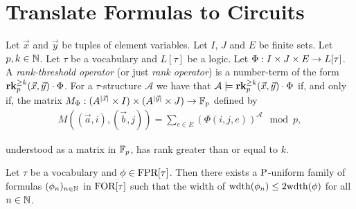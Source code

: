 \documentclass[../main/thesis.tex]{subfiles}
\begin{document}
\section{Translate Formulas to Circuits}

\begin{definition}
  Let $\vec{x}$ and $\vec{y}$ be tuples of element variables. Let $I$, $J$ and
  $E$ be finite sets. Let $p , k \in \mathbb{N}$. Let $\tau$ be a vocabulary and
  $L[\tau]$ be a logic. Let $\Phi : I \times J \times E \rightarrow L[\tau]$. A
  \emph{rank-threshold operator} (or just \emph{rank operator}) is a number-term
  of the form $\text{\textbf{rk}}^{\geq k}_p (\vec{x}, \vec{y}) \cdot \Phi$. For a
  $\tau$-structure $\mathcal{A}$ we have that $\mathcal{A} \models \text{\textbf{rk}}^{\geq
    k}_p (\vec{x}, \vec{y}) \cdot \Phi$ if, and only if, the matrix $M_\Phi :
  (A^{\vert \vec{x} \vert} \times I) \times (A^{\vert \vec{y} \vert} \times J)
  \rightarrow \mathbb{F}_p$ defined by
  \begin{align*}
    M((\vec{a}, i), (\vec{b}, j)) = \sum_{e
    \in E} (\Phi(i,j,e))^{\mathcal{A}} \mod p,
  \end{align*}

  understood as a matrix in $\mathbb{F}_p$, has rank greater than or equal to $k$.
\end{definition}

\begin{lem}
  Let $\tau$ be a vocabulary and $\phi \in \text{\upshape FPR}[\tau]$. Then there exists a
  $\mathrm{P}$-uniform family of formulas $(\phi_n)_{n \in \mathbb{N}}$ in $\text{\upshape FOR}[\tau]$ such
  that the width of $\mathrm{wdth}(\phi_n) \leq 2 \mathrm{wdth} (\phi)$ for all $n \in \mathbb{N}$.
\end{lem}
\end{document}
